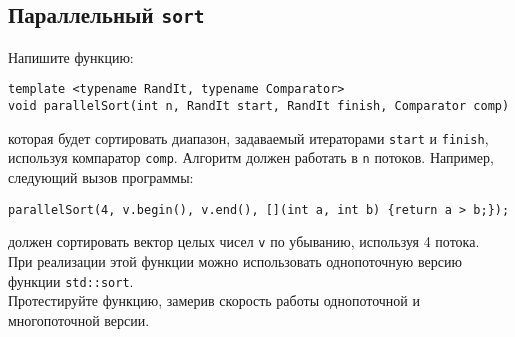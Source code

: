 \documentclass{article}
\begin{document}
\subsection{Параллельный \texttt{sort}}
Напишите функцию:
\begin{lstlisting}
template <typename RandIt, typename Comparator>
void parallelSort(int n, RandIt start, RandIt finish, Comparator comp)
\end{lstlisting}
которая будет сортировать диапазон, задаваемый итераторами \texttt{start} и \texttt{finish}, используя компаратор \texttt{comp}.
Алгоритм должен работать в \texttt{n} потоков.
Например, следующий вызов программы:
\begin{lstlisting}
parallelSort(4, v.begin(), v.end(), [](int a, int b) {return a > b;});
\end{lstlisting}
должен сортировать вектор целых чисел \texttt{v} по убыванию, используя 4 потока.\\
При реализации этой функции можно использовать однопоточную версию функции \texttt{std::sort}.\\
Протестируйте функцию, замерив скорость работы однопоточной и многопоточной версии.
\end{document}
